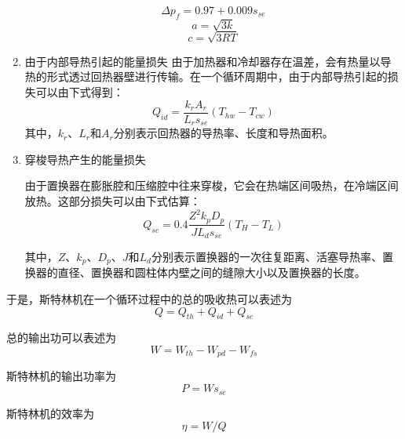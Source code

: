 \begin{enumerate}[label=(\arabic*)]
\begin{equation}
	\Delta p_f = 0.97+0.009s_{se}
\end{equation}
\begin{equation}
	a = \sqrt{3k}
\end{equation}
\begin{equation}
	c = \sqrt{3RT}
\end{equation}

\item 由于内部导热引起的能量损失
由于加热器和冷却器存在温差，会有热量以导热的形式透过回热器壁进行传输\cite{Strauss2010}。在一个循环周期中，由于内部导热引起的损失可以由下式得到：
\begin{equation}
	Q_{id} = \frac{k_rA_r}{L_rs_{se}}(T_{hw} - T_{cw})
\end{equation}
其中，$k_r$、$L_r$和$A_r$分别表示回热器的导热率、长度和导热面积。

\item 穿梭导热产生的能量损失

由于置换器在膨胀腔和压缩腔中往来穿梭，它会在热端区间吸热，在冷端区间放热。这部分损失可以由下式估算\cite{Timoumi2008}：
\begin{equation}
	Q_{sc} = 0.4\frac{Z^2k_pD_p}{JL_ds_{se}}(T_{H} - T_{L})
\end{equation}

其中，$Z$、$k_p$、$D_p$、$J$和$L_d$分别表示置换器的一次往复距离、活塞导热率、置换器的直径、置换器和圆柱体内壁之间的缝隙大小以及置换器的长度。

\end{enumerate}

于是，斯特林机在一个循环过程中的总的吸收热可以表述为
\begin{equation}
	Q = Q_{th} + Q_{id} + Q_{sc}
\end{equation}

总的输出功可以表述为
\begin{equation}
	W = W_{th} - W_{pd} - W_{fs}
\end{equation}

斯特林机的输出功率为
\begin{equation}
	P = Ws_{se}
	\label{Eq:P}
\end{equation}

斯特林机的效率为
\begin{equation}
	\eta = W/Q
	\label{Eq:eta}
\end{equation}


